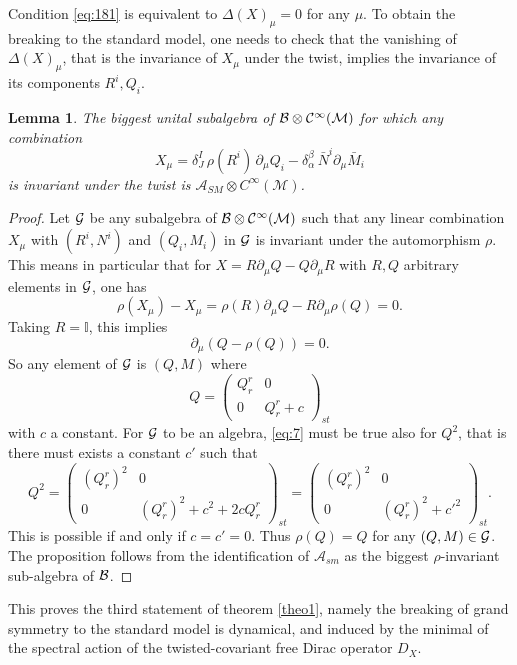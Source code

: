 \documentclass[11pt]{article}
\newcommand{\cinf}{{C^\infty({\cal M})}}
\newcommand{\M}{\mathcal M}
\newcommand{\A}{\mathcal A}
\newcommand{\del}{\partial}
\newtheorem{lemma}[prop]{Lemma}
\begin{document}
Condition \eqref{eq:181} is equivalent to
$\Delta(X)_\mu=0$ for any $\mu$. To obtain the breaking to the standard model, one needs to check
that the vanishing of $\Delta(X)_\mu$, that is
the invariance of $X_\mu$ under the twist, implies the invariance of its
components $R^i, Q_i$.
\begin{lemma}
\label{propinv}
  The biggest unital subalgebra of $\cal B\otimes \cinf$ for which any
  combination
  \begin{equation}
X_\mu=\delta^I_J\,\rho(R^i)\,\del_\mu Q_i - \delta_\alpha^\beta
  \,\bar N^i \del_\mu \bar  M_i
\label{eq:21}
  \end{equation}
is invariant under the twist is
  $\A_{SM}\otimes C^\infty(\M)$.
\end{lemma}
\begin{proof} Let $\cal  G$ be any subalgebra of $\cal B\otimes \cinf$
  such that any  linear
  combination $X_\mu$ with $(R^i, N^i)$ and  $(Q_i, M_i)$ in $\cal
 G$ is invariant under the automorphism $\rho$. This means in
 particular that for $X =
 R\del_\mu Q - Q\del_\mu R$ with $R, Q$ arbitrary elements in $\cal
 G$, one has 
  \begin{equation}
    \label{eq:20}
    \rho(X_\mu) - X_\mu = \rho(R) \del_\mu Q - R
    \del_\mu\rho(Q) = 0.
  \end{equation}
Taking $R=\mathbb I$, this implies 
\begin{equation}
  \label{eq:19}
  \del_\mu (Q - \rho(Q)) = 0.
\end{equation}
So any element of $\cal G$ is $(Q, M)$ where
\begin{equation}
  \label{eq:7}
  Q =\left(\begin{array}{cc}
Q_r^r & 0 \\ 0 &Q_r^r + c
\end{array}\right)_{st}
\end{equation}
with  $c$ a constant.
For $\cal G$ to be an algebra, \eqref{eq:7} must be true also for
$Q^2$, that is there must exists a constant $c'$ such that 
\begin{equation}
  \label{eq:7bis}
  Q^2 =\left(\begin{array}{cc}
{(Q_r^r)}^2 & 0 \\ 0 & ({Q_r^r})^2 + c^2 + 2cQ_r^r 
\end{array}\right)_{st} =\left(\begin{array}{cc}
{(Q_r^r)}^2 & 0 \\ 0 & ({Q_r^r})^2 + {c'}^2 
\end{array}\right)_{st}. 
\end{equation}
This is possible if and only if $c=c'=0$. Thus $\rho(Q) = Q$ for any
$(Q, M)\in \cal G$. The proposition follows from the identification of
$\A_{sm}$ as the biggest $\rho$-invariant sub-algebra of $\cal B$.
\end{proof}
\noindent This proves the third statement of theorem \ref{theo1}, namely the
breaking of grand symmetry to the standard model is
  dynamical, and induced by the minimal of the spectral action of the
  twisted-covariant free Dirac operator $D_X$.  
\end{document}
